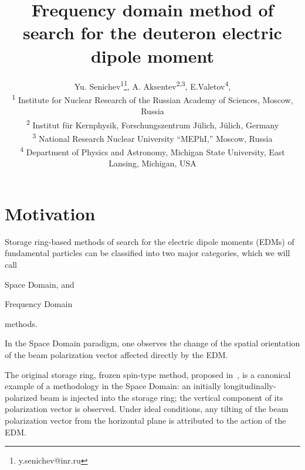 \documentclass[a4paper]{jacow}
\begin{document}
\title{Frequency domain method of search for the deuteron electric dipole moment}

\author{Yu. Senichev\textsuperscript{1}\thanks{y.senichev@inr.ru},
  A. Aksentev\textsuperscript{2,}\textsuperscript{3},
  E.Valetov\textsuperscript{4}, \\
  \textsuperscript{1} Institute for Nuclear Research of the Russian Academy of Sciences, Moscow, Russia\\
  \textsuperscript{2} Institut f\"ur Kernphysik, Forschungszentrum J\"ulich, J\"ulich, Germany\\
  \textsuperscript{3} National Research Nuclear University ``MEPhI,'' Moscow, Russia\\
  \textsuperscript{4} Department of Physics and Astronomy, Michigan State University, East Lansing, Michigan, USA}

\maketitle

\section{Motivation}

Storage ring-based methods of search for the electric dipole moments (EDMs) of fundamental particles
can be classified into two major categories, which we will call
\begin{inparaenum}
\item Space Domain, and %
\item Frequency Domain %
\end{inparaenum}
methods.

In the Space Domain paradigm, one observes the change of the spatial orientation of the beam polarization vector 
affected directly by the EDM.

The original storage ring, frozen spin-type method, proposed in~\cite{BNL:Deuteron2008}, is a canonical example of
a methodology in the Space Domain: an initially longitudinally-polarized beam is injected into the storage ring;
the vertical component of its polarization vector is observed. Under ideal conditions, any tilting of
the beam polarization vector from the horizontal plane is attributed to the action of the EDM.
\end{document}
